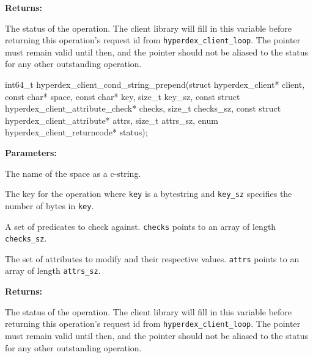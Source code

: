 \noindent\textbf{Returns:}
\begin{description}[labelindent=\widthof{{\texttt{status}}},leftmargin=*,noitemsep,nolistsep,align=right]
\item[\texttt{status}] The status of the operation.  The client library will fill in this variable before returning this operation's request id from \texttt{hyperdex\_client\_loop}.  The pointer must remain valid until then, and the pointer should not be aliased to the status for any other outstanding operation.
\end{description}

\funcsep
\begin{ccode}
int64_t hyperdex_client_cond_string_prepend(struct hyperdex_client* client,
                const char* space,
                const char* key, size_t key_sz,
                const struct hyperdex_client_attribute_check* checks, size_t checks_sz,
                const struct hyperdex_client_attribute* attrs, size_t attrs_sz,
                enum hyperdex_client_returncode* status);
\end{ccode}
\funcdesc 

\noindent\textbf{Parameters:}
\begin{description}[labelindent=\widthof{{\texttt{checks}, \texttt{checks\_sz}}},leftmargin=*,noitemsep,nolistsep,align=right]
\item[\texttt{space}] The name of the space as a c-string.
\item[\texttt{key}, \texttt{key\_sz}] The key for the operation where \texttt{key} is a bytestring and \texttt{key\_sz} specifies the number of bytes in \texttt{key}.
\item[\texttt{checks}, \texttt{checks\_sz}] A set of predicates to check against.  \texttt{checks} points to an array of length \texttt{checks\_sz}.
\item[\texttt{attrs}, \texttt{attrs\_sz}] The set of attributes to modify and their respective values.  \texttt{attrs} points to an array of length \texttt{attrs\_sz}.
\end{description}

\noindent\textbf{Returns:}
\begin{description}[labelindent=\widthof{{\texttt{status}}},leftmargin=*,noitemsep,nolistsep,align=right]
\item[\texttt{status}] The status of the operation.  The client library will fill in this variable before returning this operation's request id from \texttt{hyperdex\_client\_loop}.  The pointer must remain valid until then, and the pointer should not be aliased to the status for any other outstanding operation.
\end{description}

